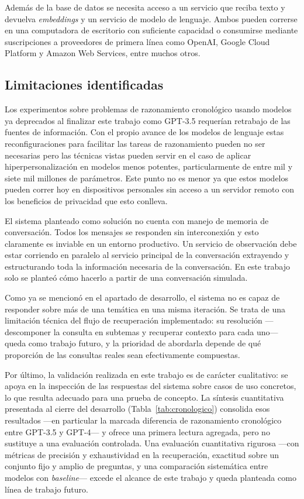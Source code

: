 Además de la base de datos se necesita acceso a un servicio que reciba texto y devuelva \textit{embeddings} y un servicio de modelo de lenguaje. Ambos pueden correrse en una computadora de escritorio con suficiente capacidad o consumirse mediante suscripciones a proveedores de primera línea como OpenAI, Google Cloud Platform y Amazon Web Services, entre muchos otros.

\subsection{Limitaciones identificadas}

Los experimentos sobre problemas de razonamiento cronológico usando modelos ya deprecados al finalizar este trabajo como GPT-3.5 requerían retrabajo de las fuentes de información. Con el propio avance de los modelos de lenguaje estas reconfiguraciones para facilitar las tareas de razonamiento pueden no ser necesarias pero las técnicas vistas pueden servir en el caso de aplicar hiperpersonalización en modelos menos potentes, particularmente de entre mil y siete mil millones de parámetros. Este punto no es menor ya que estos modelos pueden correr hoy en dispositivos personales sin acceso a un servidor remoto con los beneficios de privacidad que esto conlleva.

El sistema planteado como solución no cuenta con manejo de memoria de conversación. Todos los mensajes se responden sin interconexión y esto claramente es inviable en un entorno productivo. Un servicio de observación debe estar corriendo en paralelo al servicio principal de la conversación extrayendo y estructurando toda la información necesaria de la conversación. En este trabajo solo se planteó cómo hacerlo a partir de una conversación simulada.

Como ya se mencionó en el apartado de desarrollo, el sistema no es capaz de responder sobre más de una temática en una misma iteración. Se trata de una limitación técnica del flujo de recuperación implementado: su resolución —descomponer la consulta en subtemas y recuperar contexto para cada uno— queda como trabajo futuro, y la prioridad de abordarla depende de qué proporción de las consultas reales sean efectivamente compuestas.

Por último, la validación realizada en este trabajo es de carácter cualitativo: se apoya en la inspección de las respuestas del sistema sobre casos de uso concretos, lo que resulta adecuado para una prueba de concepto. La síntesis cuantitativa presentada al cierre del desarrollo (Tabla~\ref{tab:cronologico}) consolida esos resultados —en particular la marcada diferencia de razonamiento cronológico entre GPT-3.5 y GPT-4— y ofrece una primera lectura agregada, pero no sustituye a una evaluación controlada. Una evaluación cuantitativa rigurosa —con métricas de precisión y exhaustividad en la recuperación, exactitud sobre un conjunto fijo y amplio de preguntas, y una comparación sistemática entre modelos con \textit{baseline}— excede el alcance de este trabajo y queda planteada como línea de trabajo futuro.

